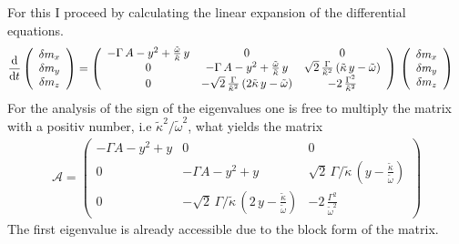 \documentclass{article}
\begin{document}
For this I proceed by calculating the linear expansion of the differential equations.
\begin{align*}
    \frac{\text{d}}{\text{d}t}\left(\begin{array}{c}
         \delta m_x\\
         \delta m_y\\
         \delta m_z
    \end{array}\right)&=\left( \begin{array}{ccc}
        -\Gamma\,A-y^2+\frac{\tilde{\omega}}{\tilde{\kappa}}\,y&  0 & 0\\
        0 & -\Gamma\,A-y^2+\frac{\tilde{\omega}}{\tilde{\kappa}}\,y & \sqrt{2}\,\frac{\Gamma}{\tilde{\kappa}^2}\,(\tilde{\kappa}\,y-\tilde{\omega})\\
        0 &  -\sqrt{2}\,\frac{\Gamma}{\tilde{\kappa}^2}\,(2\tilde{\kappa}\,y-\tilde{\omega}) & -2\,\frac{\Gamma^2}{\tilde{\kappa}^2}
    \end{array} \right)\,\left(\begin{array}{c}
         \delta m_x\\
         \delta m_y\\
         \delta m_z
    \end{array}\right)
\end{align*}
For the analysis of the sign of the eigenvalues one is free to multiply the matrix with a positiv number, i.e $\tilde{\kappa}^2/\tilde{\omega}^2$, what yields the matrix
\begin{align*}
    \mathcal{A}=\left( \begin{array}{ccc}
        -\Gamma A-{y}^2+{y}&  0 & 0\\
        0 & -\Gamma A-{y}^2+{y}& \sqrt{2}\,\Gamma/\tilde{\kappa}\,({y}-\frac{\tilde{\kappa}}{\tilde{\omega}})\\
        0 &  -\sqrt{2}\,\Gamma/\tilde{\kappa}\,(2\,{y}-\frac{\tilde{\kappa}}{\tilde{\omega}}) & -2\,\frac{\Gamma^2}{\tilde{\omega}^2}
    \end{array} \right)
\end{align*}\newpage
The first eigenvalue is already accessible due to the block form of the matrix.
\end{document}
